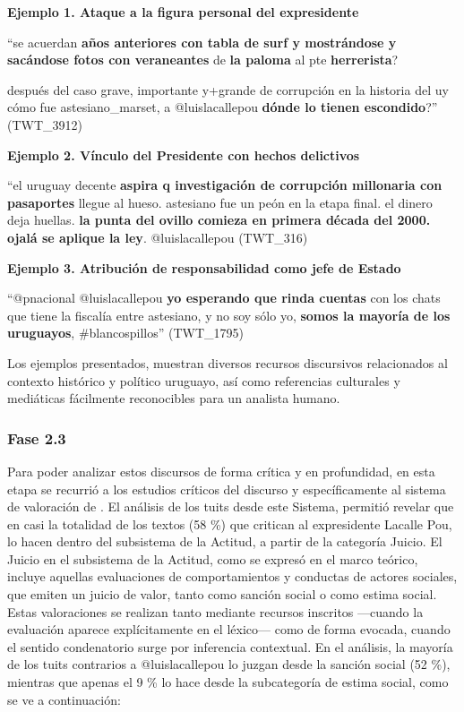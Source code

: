 \documentclass[spanish]{textolivre}
\begin{document}
\textbf{Ejemplo 1. Ataque a la figura personal del expresidente}

“se acuerdan \textbf{años anteriores con tabla de surf y mostrándose y sacándose fotos con veraneantes} de \textbf{la paloma} al pte \textbf{herrerista}?

después del caso grave, importante y+grande de corrupción en la historia del uy cómo fue astesiano\_marset, a @luislacallepou \textbf{dónde lo tienen escondido}?” (TWT\_3912)

\textbf{Ejemplo 2. Vínculo del Presidente con hechos delictivos}

“el uruguay decente \textbf{aspira q investigación de corrupción millonaria con pasaportes} llegue al hueso. astesiano fue un peón en la etapa final. el dinero deja huellas. \textbf{la punta del ovillo comieza en primera década del 2000. ojalá se aplique la ley}. @luislacallepou (TWT\_316)

\textbf{Ejemplo 3. Atribución de responsabilidad como jefe de Estado}

“@pnacional @luislacallepou \textbf{yo esperando que rinda cuentas} con los chats que tiene la fiscalía entre astesiano, y no soy sólo yo, \textbf{somos la mayoría de los uruguayos}, \#blancospillos” (TWT\_1795)

Los ejemplos presentados, muestran diversos recursos discursivos relacionados al contexto histórico y político uruguayo, así como referencias culturales y mediáticas fácilmente reconocibles para un analista humano.


\subsubsection{Fase 2.3}\label{sec-codigos}
Para poder analizar estos discursos de forma crítica y en profundidad, en esta etapa se recurrió a los estudios críticos del discurso y específicamente al sistema de valoración de \textcite{martin2005language}.  El análisis de los tuits desde este Sistema, permitió revelar que en casi la totalidad de los textos (58 \%) que critican al expresidente Lacalle Pou, lo hacen dentro del subsistema de la Actitud, a partir de la categoría Juicio. El Juicio en el subsistema de la Actitud, como se expresó en el marco teórico, incluye aquellas evaluaciones de comportamientos y conductas de actores sociales, que emiten un juicio de valor, tanto como sanción social o como estima social. Estas valoraciones se realizan tanto mediante recursos inscritos —cuando la evaluación aparece explícitamente en el léxico— como de forma evocada, cuando el sentido condenatorio surge por inferencia contextual. En el análisis, la mayoría de los tuits contrarios a @luislacallepou lo juzgan desde la sanción social (52 \%), mientras que apenas el 9 \% lo hace desde la subcategoría de estima social, como se ve a continuación:
\end{document}
